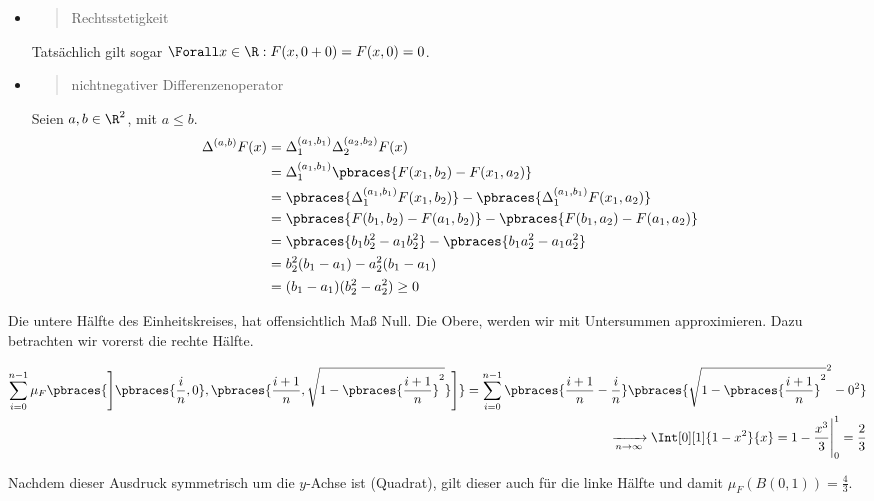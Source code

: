 \begin{solution}

\phantom{}

\begin{itemize}

  \item \blockquote{Rechtsstetigkeit}: Tatsächlich gilt sogar $\Forall x \in \R: F(x, 0 + 0) = F(x, 0) = 0$.

  \item \blockquote{nichtnegativer Differenzenoperator}: Seien $a, b \in \R^2$, mit $a \leq b$.
  \begin{align*}
    \Delta^{(a, b)} F(x)
    & =
    \Delta_1^{(a_1, b_1)}
    \Delta_2^{(a_2, b_2)}
    F(x) \\
    & =
    \Delta_1^{(a_1, b_1)}
    \pbraces{F(x_1, b_2) - F(x_1, a_2)} \\
    & =
    \pbraces{\Delta_1^{(a_1, b_1)} F(x_1, b_2)} -
    \pbraces{\Delta_1^{(a_1, b_1)} F(x_1, a_2)} \\
    & =
    \pbraces{F(b_1, b_2) - F(a_1, b_2)} -
    \pbraces{F(b_1, a_2) - F(a_1, a_2)} \\
    & =
    \pbraces{b_1 b_2^2 - a_1 b_2^2} -
    \pbraces{b_1 a_2^2 - a_1 a_2^2} \\
    & =
    b_2^2 (b_1 - a_1) - a_2^2 (b_1 - a_1) \\
    & =
    (b_1 - a_1) (b_2^2 - a_2^2)
    \geq
    0
  \end{align*}

\end{itemize}

Die untere Hälfte des Einheitskreises, hat offensichtlich Maß Null. Die Obere, werden wir mit Untersummen approximieren. Dazu betrachten wir vorerst die rechte Hälfte.

\begin{align*}
  \sum_{i=0}^{n-1}
  \mu_F
  \pbraces
  {
    \Bigg ]
      \pbraces{\frac{i}{n}, 0},
      \pbraces{\frac{i+1}{n}, \sqrt{1 - \pbraces{\frac{i+1}{n}}^2}}
    \Bigg ]
  }
  =
  \sum_{i=0}^{n-1}
  \pbraces{\frac{i+1}{n} - \frac{i}{n}}
  \pbraces{\sqrt{1 - \pbraces{\frac{i+1}{n}}^2}^2 - 0^2} \\
  \xrightarrow[n \to \infty]{}
  \Int[0][1]{1 - x^2}{x}
  =
  1 - \frac{x^3}{3} \Bigg |_0^1
  =
  \frac{2}{3}
\end{align*}

Nachdem dieser Ausdruck symmetrisch um die $y$-Achse ist (Quadrat), gilt dieser auch für die linke Hälfte und damit $\mu_F(B(0, 1)) = \frac{4}{3}$.

\end{solution}

